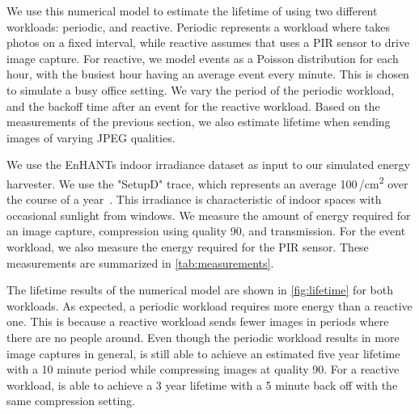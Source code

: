 We use this numerical model to estimate the lifetime of \name using two different workloads: periodic, and reactive. Periodic represents a workload where \name takes photos on a fixed interval, while reactive assumes that \name uses a PIR sensor to drive image capture. For reactive,
we model events as a Poisson distribution for each hour, with the busiest hour having an average event every minute. This is chosen to simulate a busy office setting. We vary the period of the periodic workload, and the backoff time after an event for the reactive workload.
Based on the measurements of the previous section, we also estimate lifetime when sending images of varying JPEG qualities.

We use the EnHANTs indoor irradiance dataset as input to our simulated energy harvester. We use the "SetupD" trace, which represents an average 100\,\uW/cm\textsuperscript{2} over the course of a year~\cite{Gorlatova_Infocom2011}. This irradiance is characteristic of indoor spaces with occasional sunlight from windows. We measure the amount of energy required for an image capture, compression using quality 90, and transmission. For the event workload, we also measure the energy required for the PIR sensor. These measurements are summarized in \cref{tab:measurements}.

The lifetime results of the numerical model are shown in \cref{fig:lifetime} for both workloads. As expected, a periodic workload requires more energy than a reactive one. This is because a reactive workload sends fewer images in periods where there are no people around. Even though the periodic workload results in more image captures in general, \name is still able to achieve an estimated five year lifetime with a 10 minute period while compressing images at quality 90. For a reactive workload, \name is able to achieve a 3 year lifetime with a 5 minute back off with the same compression setting.


